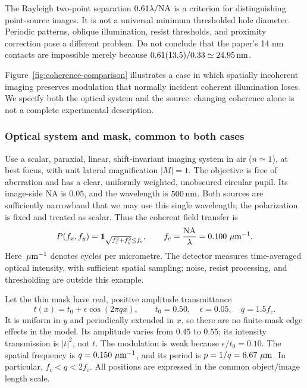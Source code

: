 The Rayleigh two-point separation $0.61\lambda/\mathrm{NA}$ is a criterion for
distinguishing point-source images. It is not a universal minimum
thresholded hole diameter. Periodic patterns, oblique illumination,
resist thresholds, and proximity correction pose a different problem.
Do not conclude that the paper's 14 nm contacts are impossible merely
because $0.61(13.5)/0.33\simeq24.95\,\mathrm{nm}$.

Figure~\ref{fig:coherence-comparison} illustrates a case in which
spatially incoherent imaging preserves modulation that normally incident
coherent illumination loses. We specify both the optical system and
the source: changing coherence alone is not a complete experimental
description.

\subsubsection*{Optical system and mask, common to both cases}
Use a scalar, paraxial, linear, shift-invariant imaging system in air
($n\simeq1$), at best focus, with unit lateral magnification $|M|=1$.
The objective is free of aberration and has a clear, uniformly weighted,
unobscured circular pupil. Its image-side NA is $0.05$, and the wavelength
is $500\,\mathrm{nm}$. Both sources are sufficiently narrowband that we may use
this single wavelength; the polarization is fixed and treated as scalar.
Thus the coherent field transfer is
\[
P(f_x,f_y)=\mathbf1_{\sqrt{f_x^2+f_y^2}\leq f_c},
\qquad
f_c=\frac{\mathrm{NA}}{\lambda}=0.100\,\,\mu\mathrm{m}^{-1}.
\]
Here $\,\mu\mathrm{m}^{-1}$ denotes cycles per micrometre. The detector measures
time-averaged optical intensity, with sufficient spatial sampling;
noise, resist processing, and thresholding are outside this example.

Let the thin mask have real, positive amplitude transmittance
\begin{equation}
t(x)=t_0+\epsilon\cos(2\pi qx),
\qquad t_0=0.50,\quad \epsilon=0.05,\quad q=1.5f_c.
\label{eq:sinusoidal-mask}
\end{equation}
It is uniform in $y$ and periodically extended in $x$, so there are no
finite-mask edge effects in the model. Its amplitude varies from
$0.45$ to $0.55$; its intensity transmission is $|t|^2$, not $t$.
The modulation is weak because $\epsilon/t_0=0.10$.
The spatial frequency is $q=0.150\,\,\mu\mathrm{m}^{-1}$, and its period is
$p=1/q=6.67\,\,\mu\mathrm{m}$. In particular, $f_c<q<2f_c$.
All positions are expressed in the common object/image length scale.

